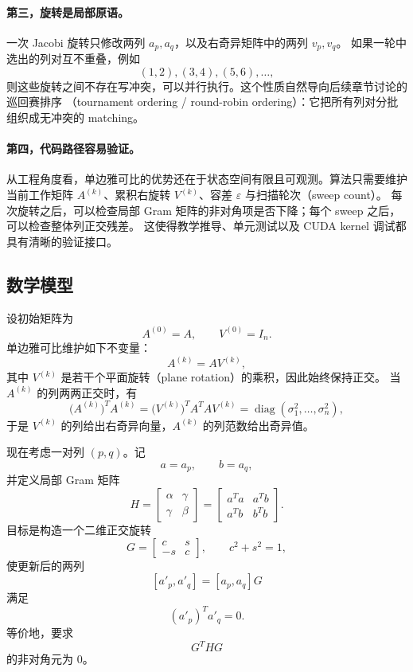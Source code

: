 \paragraph{第三，旋转是局部原语。}
一次 Jacobi 旋转只修改两列 $a_p,a_q$，以及右奇异矩阵中的两列 $v_p,v_q$。
如果一轮中选出的列对互不重叠，例如
\[
    (1,2),(3,4),(5,6),\ldots,
\]
则这些旋转之间不存在写冲突，可以并行执行。这个性质自然导向后续章节讨论的巡回赛排序
（tournament ordering / round-robin ordering）：它把所有列对分批组织成无冲突的 matching。

\paragraph{第四，代码路径容易验证。}
从工程角度看，单边雅可比的优势还在于状态空间有限且可观测。算法只需要维护当前工作矩阵
$A^{(k)}$、累积右旋转 $V^{(k)}$、容差 $\varepsilon$ 与扫描轮次（sweep count）。
每次旋转之后，可以检查局部 Gram 矩阵的非对角项是否下降；每个 sweep 之后，可以检查整体列正交残差。
这使得教学推导、单元测试以及 CUDA kernel 调试都具有清晰的验证接口。

\subsection{数学模型}

设初始矩阵为
\[
    A^{(0)}=A,\qquad V^{(0)}=I_n.
\]
单边雅可比维护如下不变量：
\[
    A^{(k)} = A V^{(k)},
\]
其中 $V^{(k)}$ 是若干个平面旋转（plane rotation）的乘积，因此始终保持正交。
当 $A^{(k)}$ 的列两两正交时，有
\[
    \bigl(A^{(k)}\bigr)^T A^{(k)}
    =
    \bigl(V^{(k)}\bigr)^T A^T A V^{(k)}
    =
    \operatorname{diag}(\sigma_1^2,\ldots,\sigma_n^2),
\]
于是 $V^{(k)}$ 的列给出右奇异向量，$A^{(k)}$ 的列范数给出奇异值。

现在考虑一对列 $(p,q)$。记
\[
    a=a_p,\qquad b=a_q,
\]
并定义局部 Gram 矩阵
\[
    H =
    \begin{bmatrix}
        \alpha & \gamma \\
        \gamma & \beta
    \end{bmatrix}
    =
    \begin{bmatrix}
        a^Ta & a^Tb \\
        a^Tb & b^Tb
    \end{bmatrix}.
\]
目标是构造一个二维正交旋转
\[
    G =
    \begin{bmatrix}
        c  & s \\
        -s & c
    \end{bmatrix},
    \qquad c^2+s^2=1,
\]
使更新后的两列
\[
    [a'_p,a'_q]=[a_p,a_q]G
\]
满足
\[
    (a'_p)^T a'_q = 0.
\]
等价地，要求
\[
    G^T H G
\]
的非对角元为 $0$。

